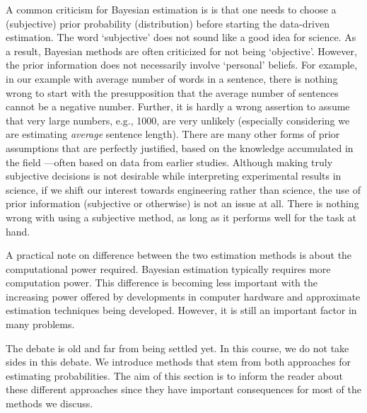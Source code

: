 A common criticism for Bayesian estimation is is that one needs to choose
a (subjective) prior probability (distribution)
before starting the data-driven estimation.
The word `subjective' does not sound like a good idea for science.
As a result,
Bayesian methods are often criticized for not being `objective'.
However, 
the prior information does not necessarily involve `personal' beliefs.
For example,
in our example with average number of words in a sentence,
there is nothing wrong to start with the presupposition that
the average number of sentences cannot be a negative number.
Further,
it is hardly a wrong assertion to assume that very large numbers,
e.g., \num{1000}, are very unlikely
(especially considering we are estimating \emph{average} sentence length).
There are many other forms of prior assumptions that are perfectly justified,
based on the knowledge accumulated in the field%
---often based on data from earlier studies.
Although making truly subjective decisions is not desirable
while interpreting experimental results in science,
if we shift our interest towards engineering rather than science,
the use of prior information (subjective or otherwise) is not
an issue at all.
There is nothing wrong with using a subjective method,
as long as it performs well for the task at hand.

A practical note on difference between the two estimation methods is
about the computational power required.
Bayesian estimation typically requires more computation power.
This difference is becoming less important
with the increasing power offered by developments in computer hardware
and approximate estimation techniques being developed.
However, it is still an important factor in many problems.

The debate is old and far from being settled yet.
In this course,
we do not take sides in this debate.
We introduce methods
that stem from both approaches for estimating probabilities.
The aim of this section is to inform the reader
about these different approaches
since they have important consequences for most of the methods we discuss.

% 
% 
% 
